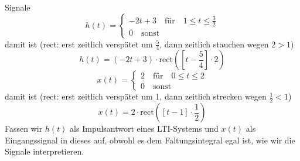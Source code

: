 \documentclass[11pt,a4paper,DIV=12]{scrartcl}
\numberwithin{equation}{section}
\numberwithin{figure}{section}
\begin{document}
\begin{Ansatz}
Signale
\begin{equation}
h(t) =
\begin{cases}
-2 t + 3 \quad \mathrm{für} \quad 1 \leq t \leq \frac{3}{2}\\
0 \quad \mathrm{sonst}
\end{cases}
\end{equation}
damit ist (rect: erst zeitlich verspätet um $\frac{5}{4}$, dann zeitlich
stauchen wegen $2>1$)
\begin{equation}
h(t) = (-2 t + 3) \cdot \mathrm{rect}\left(\left[t-\frac{5}{4}\right] \cdot 2\right)
\end{equation}
\begin{equation}
x(t)=
\begin{cases}
  2 \quad \mathrm{für} \quad 0 \leq t \leq 2\\
  0 \quad \mathrm{sonst}
\end{cases}
\end{equation}
damit ist (rect: erst zeitlich verspätet um 1, dann zeitlich strecken wegen
$\frac{1}{2}<1$)
\begin{equation}
x(t) = 2\cdot\mathrm{rect}\left(\left[t-1\right] \cdot \frac{1}{2}\right)
\end{equation}
Fassen wir $h(t)$ als Impulsantwort eines LTI-Systems und $x(t)$ als
Eingangssignal in dieses auf, obwohl es dem Faltungsintegral egal ist, wie wir
die Signale interpretieren.
\end{Ansatz}
\end{document}
